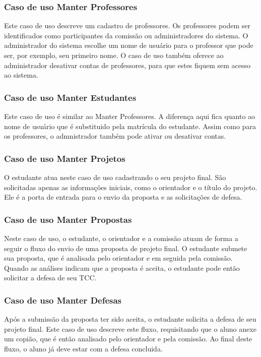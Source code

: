 \subsubsection{Caso de uso Manter Professores}
Este caso de uso descreve um cadastro de professores. Os professores podem ser identificados
como participantes da comissão ou administradores do sistema. O administrador do sistema
escolhe um nome de usuário para o professor que pode ser, por exemplo, seu primeiro nome.
O caso de uso também oferece ao administrador desativar contas de professores, para que estes
fiquem sem acesso ao sistema.

\subsubsection{Caso de uso Manter Estudantes}
Este caso de uso é similar ao Manter Professores. A diferença aqui fica quanto ao nome de usuário
que é substituido pela matrícula do estudante. Assim como para os professores, o admnistrador
também pode ativar ou desativar contas.

\subsubsection{Caso de uso Manter Projetos}
O estudante atua neste caso de uso cadastrando o seu projeto final. São solicitadas apenas as informações
iniciais, como o orientador e o título do projeto. Ele é a porta de entrada para o envio da proposta
e as solicitações de defesa.

\subsubsection{Caso de uso Manter Propostas}
Neste caso de uso, o estudante, o orientador e a comissão atuam de forma a seguir o fluxo do envio
de uma proposta de projeto final. O estudante submete sua proposta, que é analisada pelo orientador
e em seguida pela comissão. Quando as análises indicam que a proposta é aceita, o estudante pode então
solicitar a defesa de seu TCC.

\subsubsection{Caso de uso Manter Defesas}
Após a submissão da proposta ter sido aceita, o estudante solicita a defesa de seu projeto final.
Este caso de uso descreve este fluxo, requisitando que o aluno anexe um copião, que é então analisado
pelo orientador e pela comissão. Ao final deste fluxo, o aluno já deve estar com a defesa concluida.

